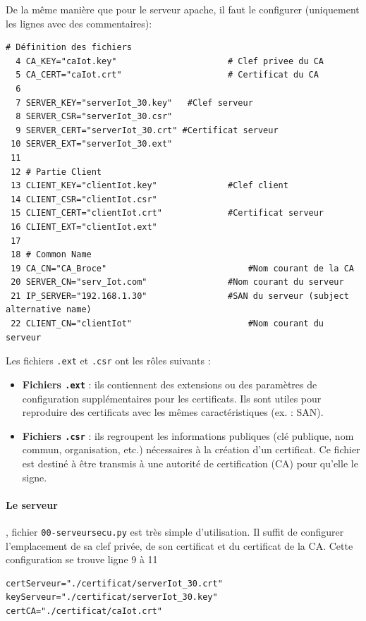 \documentclass[french, 12pt]{article}%
\newcommand{\itemE}{\item[$\bullet$]}
\begin{document}
De la même manière que pour le serveur apache, il faut le configurer (uniquement les lignes avec des commentaires): 

\begin{lstlisting}[style=commande]
 # Définition des fichiers
  4 CA_KEY="caIot.key"   					# Clef privee du CA
  5 CA_CERT="caIot.crt"  					# Certificat du CA
  6 
  7 SERVER_KEY="serverIot_30.key"  	#Clef serveur
  8 SERVER_CSR="serverIot_30.csr"
  9 SERVER_CERT="serverIot_30.crt" #Certificat serveur
 10 SERVER_EXT="serverIot_30.ext"
 11 
 12 # Partie Client
 13 CLIENT_KEY="clientIot.key"				#Clef client
 14 CLIENT_CSR="clientIot.csr"
 15 CLIENT_CERT="clientIot.crt"				#Certificat serveur
 16 CLIENT_EXT="clientIot.ext"
 17 
 18 # Common Name
 19 CA_CN="CA_Broce"							#Nom courant de la CA
 20 SERVER_CN="serv_Iot.com"				#Nom courant du serveur
 21 IP_SERVER="192.168.1.30"				#SAN du serveur (subject alternative name)
 22 CLIENT_CN="clientIot"						#Nom courant du serveur
\end{lstlisting}

Les fichiers \texttt{.ext} et \texttt{.csr} ont les rôles suivants : 
\begin{itemize}
  \itemE \textbf{Fichiers \texttt{.ext}} : ils contiennent des extensions ou des paramètres de configuration supplémentaires pour les certificats. Ils sont utiles pour reproduire des certificats avec les mêmes caractéristiques (ex. : SAN).
  
  \itemE \textbf{Fichiers \texttt{.csr}} : ils regroupent les informations publiques (clé publique, nom commun, organisation, etc.) nécessaires à la création d’un certificat. Ce fichier est destiné à être transmis à une autorité de certification (CA) pour qu’elle le signe.
\end{itemize}


\paragraph{Le serveur}, fichier \verb?00-serveursecu.py? est très simple d'utilisation. Il suffit de configurer l'emplacement de sa clef privée, de son certificat et du certificat de la CA. Cette configuration se trouve ligne 9 à 11

\begin{lstlisting}[style=commande]
certServeur="./certificat/serverIot_30.crt"
keyServeur="./certificat/serverIot_30.key"                                                  
certCA="./certificat/caIot.crt"
\end{lstlisting}
\end{document}
